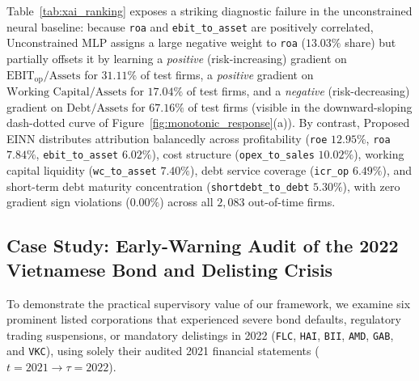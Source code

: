 \documentclass[pdflatex,sn-mathphys-num,twocolumn]{sn-jnl}
\theoremstyle{thmstyleone}
\theoremstyle{thmstyletwo}
\theoremstyle{thmstylethree}
\begin{document}
Table~\ref{tab:xai_ranking} exposes a striking diagnostic failure in the unconstrained neural baseline: because \texttt{roa} and \texttt{ebit\_to\_asset} are positively correlated, Unconstrained MLP assigns a large negative weight to \texttt{roa} ($13.03\%$ share) but partially offsets it by learning a \textit{positive} (risk-increasing) gradient on $\text{EBIT}_{\text{op}}/\text{Assets}$ for $31.11\%$ of test firms, a \textit{positive} gradient on $\text{Working Capital}/\text{Assets}$ for $17.04\%$ of test firms, and a \textit{negative} (risk-decreasing) gradient on $\text{Debt}/\text{Assets}$ for $67.16\%$ of test firms (visible in the downward-sloping dash-dotted curve of Figure~\ref{fig:monotonic_response}(a)). By contrast, Proposed EINN distributes attribution balancedly across profitability (\texttt{roe} $12.95\%$, \texttt{roa} $7.84\%$, \texttt{ebit\_to\_asset} $6.02\%$), cost structure (\texttt{opex\_to\_sales} $10.02\%$), working capital liquidity (\texttt{wc\_to\_asset} $7.40\%$), debt service coverage (\texttt{icr\_op} $6.49\%$), and short-term debt maturity concentration (\texttt{shortdebt\_to\_debt} $5.30\%$), with zero gradient sign violations ($0.00\%$) across all $2,083$ out-of-time firms.

\subsection{Case Study: Early-Warning Audit of the 2022 Vietnamese Bond and Delisting Crisis}
To demonstrate the practical supervisory value of our framework, we examine six prominent listed corporations that experienced severe bond defaults, regulatory trading suspensions, or mandatory delistings in 2022 (\texttt{FLC}, \texttt{HAI}, \texttt{BII}, \texttt{AMD}, \texttt{GAB}, and \texttt{VKC}), using solely their audited 2021 financial statements ($t=2021 \to \tau=2022$).
\end{document}
